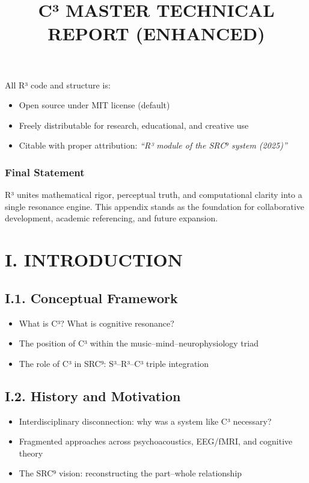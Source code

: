All R³ code and structure is:

\begin{itemize}
    \item Open source under MIT license (default)
    \item Freely distributable for research, educational, and creative use
    \item Citable with proper attribution: \textit{“R³ module of the SRC⁹ system (2025)”}
\end{itemize}

\subsubsection*{Final Statement}

R³ unites mathematical rigor, perceptual truth, and computational clarity into a single resonance engine. This appendix stands as the foundation for collaborative development, academic referencing, and future expansion.



\title{\textbf{C³ MASTER TECHNICAL REPORT (ENHANCED)}}
\date{}


\maketitle

\section*{I. INTRODUCTION}

\subsection*{I.1. Conceptual Framework}

\begin{itemize}
    \item What is C³? What is cognitive resonance?
    \item The position of C³ within the music–mind–neurophysiology triad
    \item The role of C³ in SRC⁹: S³–R³–C³ triple integration
\end{itemize}

\subsection*{I.2. History and Motivation}

\begin{itemize}
    \item Interdisciplinary disconnection: why was a system like C³ necessary?
    \item Fragmented approaches across psychoacoustics, EEG/fMRI, and cognitive theory
    \item The SRC⁹ vision: reconstructing the part–whole relationship
\end{itemize}

